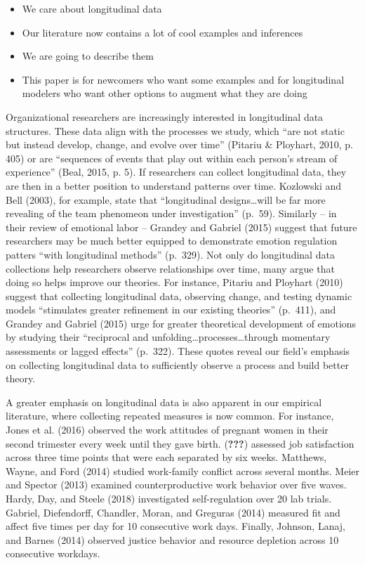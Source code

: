 \documentclass[english,,man]{apa6}
\providecommand{\tightlist}{%
  \setlength{\itemsep}{0pt}\setlength{\parskip}{0pt}}
\theoremstyle{definition}
\theoremstyle{definition}
\theoremstyle{definition}
\theoremstyle{remark}
\begin{document}
\begin{itemize}
\tightlist
\item
  We care about longitudinal data
\item
  Our literature now contains a lot of cool examples and inferences
\item
  We are going to describe them
\item
  This paper is for newcomers who want some examples and for
  longitudinal modelers who want other options to augment what they are
  doing
\end{itemize}

Organizational researchers are increasingly interested in longitudinal
data structures. These data align with the processes we study, which
\enquote{are not static but instead develop, change, and evolve over
time} (Pitariu \& Ployhart, 2010, p. 405) or are \enquote{sequences of
events that play out within each person's stream of experience} (Beal,
2015, p. 5). If researchers can collect longitudinal data, they are then
in a better position to understand patterns over time. Kozlowski and
Bell (2003), for example, state that \enquote{longitudinal
designs\ldots{}will be far more revealing of the team phenomeon under
investigation} (p.~59). Similarly -- in their review of emotional labor
-- Grandey and Gabriel (2015) suggest that future researchers may be
much better equipped to demonstrate emotion regulation patters
\enquote{with longitudinal methods} (p.~329). Not only do longitudinal
data collections help researchers observe relationships over time, many
argue that doing so helps improve our theories. For instance, Pitariu
and Ployhart (2010) suggest that collecting longitudinal data, observing
change, and testing dynamic models \enquote{stimulates greater
refinement in our existing theories} (p.~411), and Grandey and Gabriel
(2015) urge for greater theoretical development of emotions by studying
their \enquote{reciprocal and unfolding\ldots{}processes\ldots{}through
momentary assessments or lagged effects} (p.~322). These quotes reveal
our field's emphasis on collecting longitudinal data to sufficiently
observe a process and build better theory.

A greater emphasis on longitudinal data is also apparent in our
empirical literature, where collecting repeated measures is now common.
For instance, Jones et al. (2016) observed the work attitudes of
pregnant women in their second trimester every week until they gave
birth. ({\textbf{???}}) assessed job satisfaction across three time
points that were each separated by six weeks. Matthews, Wayne, and Ford
(2014) studied work-family conflict across several months. Meier and
Spector (2013) examined counterproductive work behavior over five waves.
Hardy, Day, and Steele (2018) investigated self-regulation over 20 lab
trials. Gabriel, Diefendorff, Chandler, Moran, and Greguras (2014)
measured fit and affect five times per day for 10 consecutive work days.
Finally, Johnson, Lanaj, and Barnes (2014) observed justice behavior and
resource depletion across 10 consecutive workdays.
\end{document}
